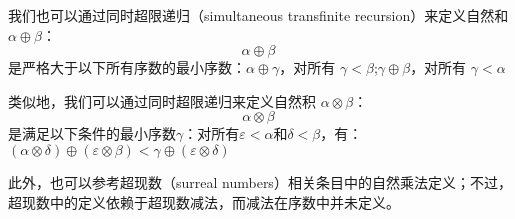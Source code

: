 我们也可以通过同时超限递归（simultaneous transfinite recursion）来定义自然和 \(\alpha \oplus \beta\)：  
\[
\alpha \oplus \beta~
\]
是严格大于以下所有序数的最小序数：\(\alpha \oplus \gamma\)，对所有 \(\gamma < \beta\);\(\gamma \oplus \beta\)，对所有 \(\gamma < \alpha\)

类似地，我们可以通过同时超限递归来定义自然积 \(\alpha \otimes \beta\)：  
\[
\alpha \otimes \beta~
\]
是满足以下条件的最小序数\(\gamma\)：对所有\(\varepsilon < \alpha\)和\(\delta < \beta\)，有：\((\alpha \otimes \delta) \oplus (\varepsilon \otimes \beta) < \gamma \oplus (\varepsilon \otimes \delta)\)

此外，也可以参考超现数（surreal numbers）相关条目中的自然乘法定义；不过，超现数中的定义依赖于超现数减法，而减法在序数中并未定义。